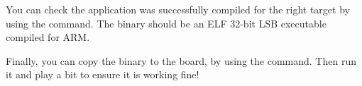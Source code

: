 You can check the application was successfully compiled for the right
target by using the  command.  The  binary should be
an ELF 32-bit LSB executable compiled for ARM.

Finally, you can copy the binary to the board, by using the 
command. Then run it and play a bit to ensure it is working fine!
